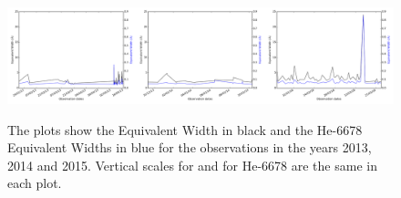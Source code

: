 \begin{table}[!htbp]
\centering
{}
\caption{The seven spectra with Equivalent Widths over 6.000, in descending order, also showing the values of the
  Equivalent Width and that of the He-6678 absorption line. Five spectra have the one of the seven strongest {\ha} lines
  and also one of the seven strongest {\ha} lines. The two He-6678 Equivalent Widths marked with * are where the spectra
  have one of the seven strongest {\ha} lines but are not in the seven strongest He-6678 lines and vice versa for the
  two lines at the bottom of the table marked with $\dagger$.}
\protect\label{table:excessews}
\end{table}

\begin{figure}[!htbp]
\begin{center}
\includegraphics[scale=0.18]{Figures/dualcomb.png} \\
\end{center}   
\caption{The plots show the {\ha} Equivalent Width in black and the He-6678 Equivalent Widths in blue for the {\harps}
  observations in the years 2013, 2014 and 2015. Vertical scales for {\ha} and for He-6678 are the same in each plot.}
 \protect\label{fig:dualews}
\end{figure}
